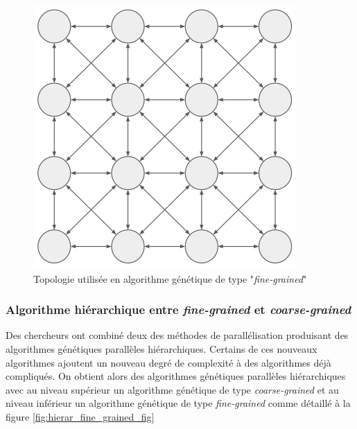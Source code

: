 \documentclass[12pt,a4paper]{article}
\begin{document}
	\begin{figure}[!h]
		\begin{center}
			\includegraphics[scale=.3]{img/fine_grained_fig.png}
			\caption{Topologie utilisée en algorithme génétique de type "\emph{fine-grained}"}
			\label{fig:fine_grained_fig}
		\end{center}
	\end{figure} 
	
	\subsubsection{Algorithme hiérarchique entre \emph{fine-grained} et \emph{coarse-grained}}
	Des chercheurs ont combiné deux des méthodes de parallélisation produisant des algorithmes génétiques parallèles hiérarchiques. Certains de ces nouveaux algorithmes ajoutent un nouveau degré de complexité à des algorithmes déjà compliqués. On obtient alors des algorithmes génétiques parallèles hiérarchiques avec au niveau supérieur un algorithme génétique de type \emph{coarse-grained} et au niveau inférieur un algorithme génétique de type \emph{fine-grained} comme détaillé à la figure \ref{fig:hierar_fine_grained_fig}
	
\end{document}
